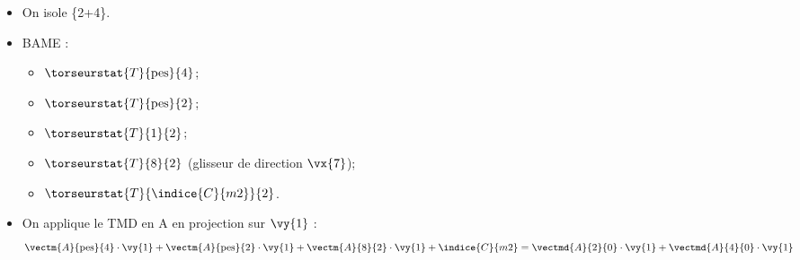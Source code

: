 \ifprof
\begin{corrige}
\begin{itemize}
\item On isole \{2+4\}.
\item BAME : 
\begin{itemize}
\item $\torseurstat{T}{\text{pes}}{4}$;
\item $\torseurstat{T}{\text{pes}}{2}$;
\item $\torseurstat{T}{1}{2}$;
\item $\torseurstat{T}{8}{2}$ (glisseur de direction $\vx{7}$);
\item $\torseurstat{T}{\indice{C}{m2}}{2}$.
\end{itemize}

\item On applique le TMD en A en projection sur $\vy{1}$ :
$$
\vectm{A}{\text{pes}}{4}\cdot \vy{1}
+\vectm{A}{\text{pes}}{2}\cdot \vy{1}
+\vectm{A}{8}{2}\cdot \vy{1} +\indice{C}{m2} = \vectmd{A}{2}{0} \cdot \vy{1} + \vectmd{A}{4}{0} \cdot \vy{1}
$$
\end{itemize}
\end{corrige}
\else
\fi


